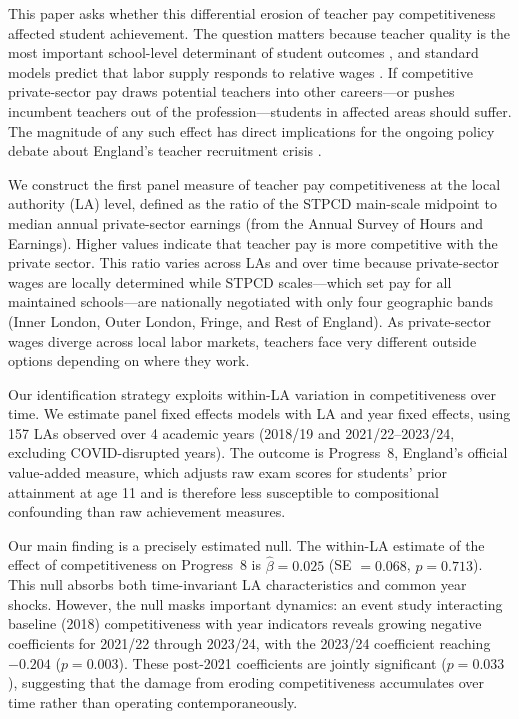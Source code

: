 \documentclass[12pt]{article}
\begin{document}
This paper asks whether this differential erosion of teacher pay competitiveness affected student achievement. The question matters because teacher quality is the most important school-level determinant of student outcomes \citep{rivkin2005teachers, chetty2014measuring1, chetty2014measuring2}, and standard models predict that labor supply responds to relative wages \citep{hanushek2011economic}. If competitive private-sector pay draws potential teachers into other careers---or pushes incumbent teachers out of the profession---students in affected areas should suffer. The magnitude of any such effect has direct implications for the ongoing policy debate about England's teacher recruitment crisis \citep{strb2023report}.

We construct the first panel measure of teacher pay competitiveness at the local authority (LA) level, defined as the ratio of the STPCD main-scale midpoint to median annual private-sector earnings (from the Annual Survey of Hours and Earnings). Higher values indicate that teacher pay is more competitive with the private sector. This ratio varies across LAs and over time because private-sector wages are locally determined while STPCD scales---which set pay for all maintained schools---are nationally negotiated with only four geographic bands (Inner London, Outer London, Fringe, and Rest of England). As private-sector wages diverge across local labor markets, teachers face very different outside options depending on where they work.

Our identification strategy exploits within-LA variation in competitiveness over time. We estimate panel fixed effects models with LA and year fixed effects, using 157 LAs observed over 4 academic years (2018/19 and 2021/22--2023/24, excluding COVID-disrupted years). The outcome is Progress~8, England's official value-added measure, which adjusts raw exam scores for students' prior attainment at age 11 and is therefore less susceptible to compositional confounding than raw achievement measures.

Our main finding is a precisely estimated null. The within-LA estimate of the effect of competitiveness on Progress~8 is $\hat{\beta} = 0.025$ (SE $= 0.068$, $p = 0.713$). This null absorbs both time-invariant LA characteristics and common year shocks. However, the null masks important dynamics: an event study interacting baseline (2018) competitiveness with year indicators reveals growing negative coefficients for 2021/22 through 2023/24, with the 2023/24 coefficient reaching $-0.204$ ($p = 0.003$). These post-2021 coefficients are jointly significant ($p = 0.033$), suggesting that the damage from eroding competitiveness accumulates over time rather than operating contemporaneously.
\end{document}
